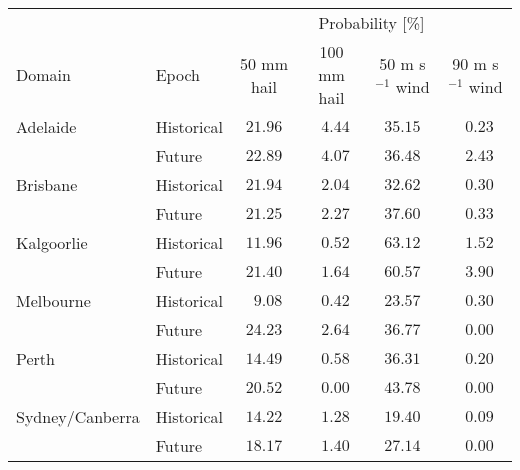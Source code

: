 \begin{tabular}{llcccc}
\hline
& & \multicolumn{4}{c}{Probability [\%]} \\ 
Domain & Epoch & 50 mm hail & 100 mm hail & 50 m s$^{-1}$ wind & \multicolumn{1}{c}{90 m s$^{-1}$ wind} \\ 
\hline
Adelaide & Historical  & $21.96$ & $\phantom{0}4.44$ & $35.15$ & $\phantom{0}0.23$ \\
 & Future  & $22.89$ & $\phantom{0}4.07$ & $36.48$ & $\phantom{0}2.43$ \\
Brisbane & Historical  & $21.94$ & $\phantom{0}2.04$ & $32.62$ & $\phantom{0}0.30$ \\
 & Future  & $21.25$ & $\phantom{0}2.27$ & $37.60$ & $\phantom{0}0.33$ \\
Kalgoorlie & Historical  & $11.96$ & $\phantom{0}0.52$ & $63.12$ & $\phantom{0}1.52$ \\
 & Future  & $21.40$ & $\phantom{0}1.64$ & $60.57$ & $\phantom{0}3.90$ \\
Melbourne & Historical  & $\phantom{0}9.08$ & $\phantom{0}0.42$ & $23.57$ & $\phantom{0}0.30$ \\
 & Future  & $24.23$ & $\phantom{0}2.64$ & $36.77$ & $\phantom{0}0.00$ \\
Perth & Historical  & $14.49$ & $\phantom{0}0.58$ & $36.31$ & $\phantom{0}0.20$ \\
 & Future  & $20.52$ & $\phantom{0}0.00$ & $43.78$ & $\phantom{0}0.00$ \\
Sydney/Canberra & Historical  & $14.22$ & $\phantom{0}1.28$ & $19.40$ & $\phantom{0}0.09$ \\
 & Future  & $18.17$ & $\phantom{0}1.40$ & $27.14$ & $\phantom{0}0.00$ \\
\hline 
\end{tabular}
